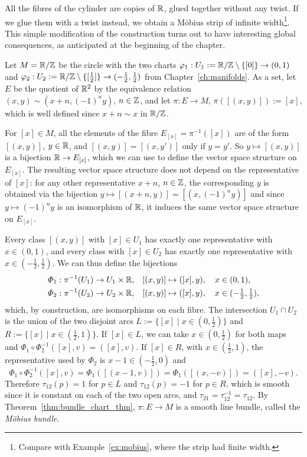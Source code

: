 \begin{example}\label{ex:mobius_bundle}
	All the fibres of the cylinder are copies of $\mathbb{R}$, glued together without any twist.
	If we glue them with a twist instead, we obtain a M\"obius strip of infinite width\footnote{Compare with Example~\ref{ex:mobius}, where the strip had finite width.}. This simple modification of the construction turns out to have interesting global consequences, as anticipated at the beginning of the chapter.

	Let $M = \mathbb{R}/\mathbb{Z}$ be the circle with the two charts $\varphi_1:U_1 := \mathbb{R}/\mathbb{Z}\setminus\{[0]\}\to(0,1)$ and $\varphi_2:U_2 := \mathbb{R}/\mathbb{Z}\setminus\{[\frac12]\}\to(-\frac12,\frac12)$ from Chapter~\ref{ch:manifolds}.
	As a set, let $E$ be the quotient of $\mathbb{R}^2$ by the equivalence relation $(x,y)\sim(x+n,(-1)^n y)$, $n\in\mathbb{Z}$, and let $\pi:E\to M$, $\pi([(x,y)]) := [x]$, which is well defined since $x+n\sim x$ in $\mathbb{R}/\mathbb{Z}$.

	For $[x]\in M$, all the elements of the fibre $E_{[x]}=\pi^{-1}([x])$ are of the form $[(x,y)]$, $y\in\mathbb{R}$, and $[(x,y)]=[(x,y')]$ only if $y=y'$.
	So $y\mapsto[(x,y)]$ is a bijection $\mathbb{R}\to E_{[x]}$, which we can use to define the vector space structure on $E_{[x]}$.
	The resulting vector space structure does not depend on the representative of $[x]$: for any other representative $x+n$, $n\in\mathbb{Z}$, the corresponding $y$ is obtained via the bijection $y\mapsto[(x+n,y)] = [(x,(-1)^ny)]$ and since $y\mapsto(-1)^ny$ is an isomorphism of $\mathbb{R}$, it induces the same vector space structure on $E_{[x]}$.

	Every class $[(x,y)]$ with $[x]\in U_1$ has exactly one representative with $x\in(0,1)$, and every class with $[x]\in U_2$ has exactly one representative with $x\in(-\frac12,\frac12)$.
	We can thus define the bijections
	\begin{align}
		\varPhi_1:\pi^{-1}(U_1)\to U_1\times\mathbb{R}, & \quad [(x,y)]\mapsto([x],y), \quad x\in(0,1),                     \\
		\varPhi_2:\pi^{-1}(U_2)\to U_2\times\mathbb{R}, & \quad [(x,y)]\mapsto([x],y), \quad x\in(-\tfrac12,\tfrac12),
	\end{align}
	which, by construction, are isomorphisms on each fibre.
	The intersection $U_1\cap U_2$ is the union of the two disjoint arcs $L:=\{[x]\mid x\in(0,\frac12)\}$ and $R:=\{[x]\mid x\in(\frac12,1)\}$.
	If $[x]\in L$, we can take $x\in(0,\frac12)$ for both maps and $\varPhi_1\circ\varPhi_2^{-1}([x],v) = ([x],v)$.
	If $[x]\in R$, with $x\in(\frac12,1)$, the representative used by $\varPhi_2$ is $x-1\in(-\frac12,0)$ and
	\begin{equation}
		\varPhi_1\circ\varPhi_2^{-1}([x],v) = \varPhi_1([(x-1,v)]) = \varPhi_1([(x,-v)]) = ([x],-v).
	\end{equation}
	Therefore $\tau_{12}(p) = 1$ for $p\in L$ and $\tau_{12}(p)=-1$ for $p\in R$, which is smooth since it is constant on each of the two open arcs, and $\tau_{21} = \tau_{12}^{-1} = \tau_{12}$.
	By Theorem~\ref{thm:bundle_chart_thm}, $\pi:E\to M$ is a smooth line bundle, called the \emph{M\"obius bundle}.


\end{example}
